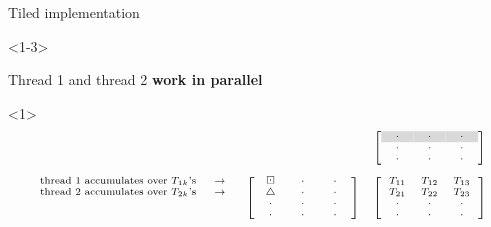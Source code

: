 \documentclass[14pt]{beamer}
\begin{document}
\begin{frame}{Tiled implementation}

\begin{onlyenv}<1-3>

Thread 1 and thread 2 \textbf{work in parallel}

\vspace{-0.3cm}

\begin{onlyenv}<1>
\[
\scriptsize
\begin{array}{ccc}
&& \left[\begin{array}{ccc}
\ \ \cl{\cdot} \ \ & \ \ \cl{\cdot} \ \  & \ \ \cl{\cdot} \ \ \\
\ \ \cdot \ \ & \ \ \cdot \ \  & \ \ \cdot \ \ \\
\ \ \cdot \ \ & \ \ \cdot \ \  & \ \ \cdot \ \ \\
\end{array}\right]\\
\\
\begin{array}{r}
\text{thread 1 accumulates over $T_{1k}$'s} \ \ \ \ \rw\\
\text{thread 2 accumulates over $T_{2k}$'s} \ \ \ \ \rw\\
\\
\\
\end{array}
& \left[\begin{array}{ccc}
\bd & \ \ \cdot \ \  & \ \ \cdot \ \  \\
\uptri & \ \ \cdot \ \  & \ \ \cdot \ \  \\
\ \ \cdot \ \ & \ \ \cdot \ \  & \ \ \cdot \ \ \\
\ \ \cdot \ \ & \ \ \cdot \ \  & \ \ \cdot \ \ \\
\end{array}\right]
& \left[\begin{array}{ccc}
T_{11} & T_{12} & T_{13} \\
T_{21} & T_{22} & T_{23} \\
\ \ \cdot \ \ & \ \ \cdot \ \  & \ \ \cdot \ \ \\
\ \ \cdot \ \ & \ \ \cdot \ \  & \ \ \cdot \ \ \\
\end{array}\right]
\end{array}
\]
\end{onlyenv}


\end{onlyenv}
\end{frame}
\end{document}
